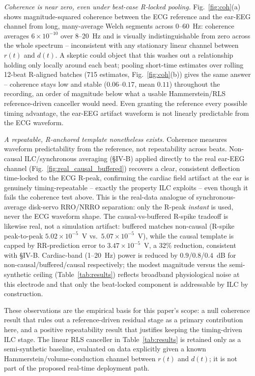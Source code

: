 \documentclass[11pt]{article}
\begin{document}
\emph{Coherence is near zero, even under best-case R-locked pooling.} Fig.~\ref{fig:coh}(a) shows
magnitude-squared coherence between the ECG reference and the ear-EEG channel from long, many-average
Welch segments across 0--60~Hz: coherence averages $6\times10^{-10}$ over 8--20~Hz and is visually
indistinguishable from zero across the whole spectrum -- inconsistent with any stationary linear
channel between $r(t)$ and $d(t)$. A skeptic could object that this washes out a relationship
holding only locally around each beat; pooling short-time estimates over rolling 12-beat R-aligned
batches (715 estimates, Fig.~\ref{fig:coh}(b)) gives the same answer -- coherence stays low and
stable ($0.06$--$0.17$, mean $0.11$) throughout the recording, an order of magnitude below what a
usable Hammerstein/RLS reference-driven canceller would need. Even granting the reference every
possible timing advantage, the ear-EEG artifact waveform is not linearly predictable from the ECG
waveform.

\emph{A repeatable, R-anchored template nonetheless exists.} Coherence measures waveform
predictability from the reference, not repeatability across beats. Non-causal ILC/synchronous
averaging (\S IV-B) applied directly to the real ear-EEG channel (Fig.~\ref{fig:real_causal_buffered})
recovers a clear, consistent deflection time-locked to the ECG R-peak, confirming the cardiac field
artifact at the ear is genuinely timing-repeatable -- exactly the property ILC exploits -- even
though it fails the coherence test above. This is the real-data analogue of synchronous-average
disk-servo RRO/NRRO separation: only the R-peak \emph{instant} is used, never the ECG waveform shape.
The causal-vs-buffered R-spike tradeoff is likewise real, not a simulation artifact: buffered matches
non-causal (R-spike peak-to-peak $5.02\times10^{-5}$~V vs.\ $5.07\times10^{-5}$~V), while the causal
template is capped by RR-prediction error to $3.47\times10^{-5}$~V, a $32\%$ reduction, consistent
with \S IV-B. Cardiac-band (1--20~Hz) power is reduced by $0.9$/$0.8$/$0.4$~dB for
non-causal/buffered/causal respectively; the modest magnitude versus the semi-synthetic ceiling
(Table~\ref{tab:results}) reflects broadband physiological noise at this electrode and that only the
beat-locked component is addressable by ILC by construction.

These observations are the empirical basis for this paper's scope: a null coherence result that
rules out a reference-driven residual stage as a primary contribution here, and a positive
repeatability result that justifies keeping the timing-driven ILC stage. The linear RLS canceller in
Table~\ref{tab:results} is retained only as a semi-synthetic baseline, evaluated on data explicitly
given a known Hammerstein/volume-conduction channel between $r(t)$ and $d(t)$; it is not part of the
proposed real-time deployment path.
\end{document}
